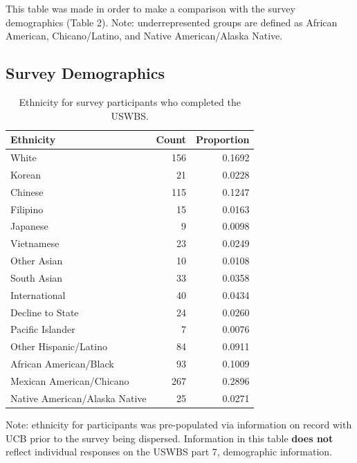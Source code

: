 \documentclass{article}\usepackage[]{graphicx}\usepackage[]{color}
\begin{document}
This table was made in order to make a comparison with the survey demographics (Table 2). Note: underrepresented groups are defined as African American, Chicano/Latino, and Native American/Alaska Native.

\pagebreak

\subsection{Survey Demographics}
 
\begin{table}[ht]
\centering
\begin{tabular}{lrr}
  \hline
Ethnicity & Count & Proportion \\ 
  \hline
                         White & 156 & 0.1692 \\ 
                          Korean & 21 & 0.0228 \\ 
                         Chinese & 115 & 0.1247 \\ 
                        Filipino & 15 & 0.0163 \\ 
                        Japanese & 9 & 0.0098 \\ 
                      Vietnamese & 23 & 0.0249 \\ 
                     Other Asian & 10 & 0.0108 \\ 
                     South Asian & 33 & 0.0358 \\ 
                   International & 40 & 0.0434 \\ 
                Decline to State & 24 & 0.0260 \\ 
                Pacific Islander & 7 & 0.0076 \\ 
           Other Hispanic/Latino & 84 & 0.0911 \\ 
          African American/Black & 93 & 0.1009 \\ 
        Mexican American/Chicano & 267 & 0.2896 \\ 
   Native American/Alaska Native & 25 & 0.0271 \\ 
   \hline
\end{tabular}
\caption{Ethnicity for survey participants who completed the USWBS.} 
\end{table}


Note: ethnicity for participants was pre-populated via information on record with UCB prior to the survey being dispersed. Information in this table \textbf{does not} reflect individual responses on the USWBS part 7, demographic information.
\end{document}
